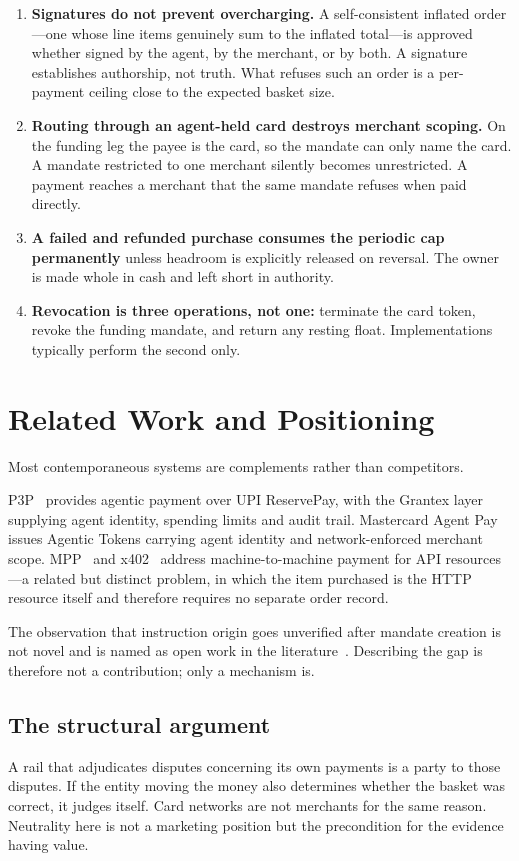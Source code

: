 \documentclass[journal,onecolumn,11pt]{IEEEtran}
\begin{document}
\begin{enumerate}[leftmargin=*]
\item \textbf{Signatures do not prevent overcharging.} A self-consistent inflated
order---one whose line items genuinely sum to the inflated total---is approved whether
signed by the agent, by the merchant, or by both. A signature establishes authorship,
not truth. What refuses such an order is a per-payment ceiling close to the expected
basket size.
\item \textbf{Routing through an agent-held card destroys merchant scoping.} On the
funding leg the payee is the card, so the mandate can only name the card. A mandate
restricted to one merchant silently becomes unrestricted. A payment reaches a merchant
that the same mandate refuses when paid directly.
\item \textbf{A failed and refunded purchase consumes the periodic cap permanently}
unless headroom is explicitly released on reversal. The owner is made whole in cash
and left short in authority.
\item \textbf{Revocation is three operations, not one:} terminate the card token,
revoke the funding mandate, and return any resting float. Implementations typically
perform the second only.
\end{enumerate}

\section{Related Work and Positioning}\label{sec:related}
Most contemporaneous systems are complements rather than competitors.

P3P~\cite{p3p} provides agentic payment over UPI ReservePay, with the Grantex layer
supplying agent identity, spending limits and audit trail. Mastercard Agent
Pay~\cite{mc-ap} issues Agentic Tokens carrying agent identity and network-enforced
merchant scope. MPP~\cite{mpp} and x402~\cite{x402} address machine-to-machine payment
for API resources---a related but distinct problem, in which the item purchased is the
HTTP resource itself and therefore requires no separate order record.

The observation that instruction origin goes unverified after mandate creation is not
novel and is named as open work in the literature~\cite{drift}. Describing the gap is
therefore not a contribution; only a mechanism is.

\subsection{The structural argument}
A rail that adjudicates disputes concerning its own payments is a party to those
disputes. If the entity moving the money also determines whether the basket was
correct, it judges itself. Card networks are not merchants for the same reason.
Neutrality here is not a marketing position but the precondition for the evidence
having value.
\end{document}
